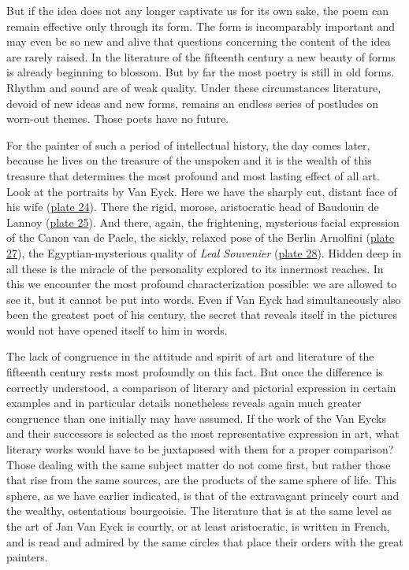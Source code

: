 But if the idea does not any longer captivate us for its own sake, the
poem can remain effective only through its form. The form is
incomparably important and may even be so new and alive that questions
concerning the content of the idea are rarely raised. In the literature
of the fifteenth century a new beauty of forms is already beginning to
blossom. But by far the most poetry is still in old forms. Rhythm and
sound are of weak quality. Under these circumstances literature, devoid
of new ideas and new forms, remains an endless series of postludes on
worn-out themes. Those poets have no future.

For the painter of such a period of intellectual history, the day comes
later, because he lives on the treasure of the unspoken and it is the
wealth of this treasure that determines the most profound and most
lasting effect of all art. Look at the portraits by Van Eyck. Here we
have the sharply cut, distant face of his wife
(\protect\hyperlink{20_ILLUSTRATIONS_FOLLOW_PAGE.xhtmlux5cux23id_23}{plate
24}). There the rigid, morose, aristocratic head of Baudouin de Lannoy
(\protect\hyperlink{20_ILLUSTRATIONS_FOLLOW_PAGE.xhtmlux5cux23id_2299}{plate
25}). And there, again, the frightening, mysterious facial expression of
the Canon van de Paele, the sickly, relaxed pose of the Berlin Arnolfini
(\protect\hyperlink{20_ILLUSTRATIONS_FOLLOW_PAGE.xhtmlux5cux23id_25}{plate
27}), the Egyptian-mysterious quality of \emph{Leal Souvenier}
(\protect\hyperlink{20_ILLUSTRATIONS_FOLLOW_PAGE.xhtmlux5cux23id_2300}{plate
28}). Hidden deep in all these is the miracle of the personality
explored to its innermost reaches. In this we encounter the most
profound characterization possible: we are allowed to see it, but it
cannot be put into words. Even if Van Eyck had simultaneously also been
the greatest poet of his century, the secret that reveals itself in the
pictures would not have opened itself to him in words.

The lack of congruence in the attitude and spirit of art and literature
of the fifteenth century rests most profoundly on this fact. But once
the difference is correctly understood, a comparison of literary and
pictorial expression in certain examples and in particular details
nonetheless reveals again much greater congruence than one
ini\protect\hypertarget{21_Chapter_Thirteen__IMAGE_AND_WORD.xhtmlux5cux23page_332}{}{}tially
may have assumed. If the work of the Van Eycks and their successors is
selected as the most representative expression in art, what literary
works would have to be juxtaposed with them for a proper comparison?
Those dealing with the same subject matter do not come first, but rather
those that rise from the same sources, are the products of the same
sphere of life. This sphere, as we have earlier indicated, is that of
the extravagant princely court and the wealthy, ostentatious
bourgeoisie. The literature that is at the same level as the art of Jan
Van Eyck is courtly, or at least aristocratic, is written in French, and
is read and admired by the same circles that place their orders with the
great painters.

